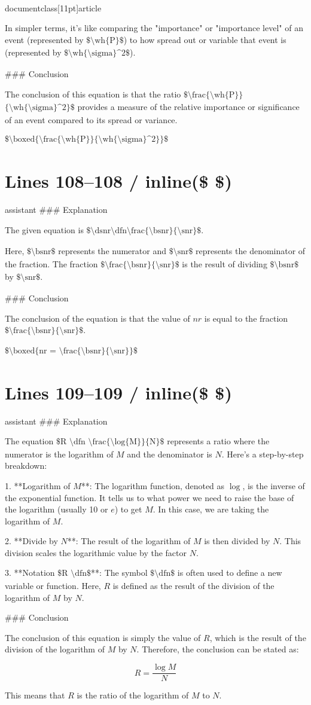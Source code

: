 \\documentclass[11pt]{article}
\begin{document}
In simpler terms, it's like comparing the "importance" or "importance level" of an event (represented by \(\wh{P}\)) to how spread out or variable that event is (represented by \(\wh{\sigma}^2\)).

### Conclusion

The conclusion of this equation is that the ratio \(\frac{\wh{P}}{\wh{\sigma}^2}\) provides a measure of the relative importance or significance of an event compared to its spread or variance.

\(\boxed{\frac{\wh{P}}{\wh{\sigma}^2}}\)


\section*{Lines 108–108 / inline(\$ \$) }
assistant
### Explanation

The given equation is \(\dsnr\dfn\frac{\bsnr}{\snr}\).

Here, \(\bsnr\) represents the numerator and \(\snr\) represents the denominator of the fraction. The fraction \(\frac{\bsnr}{\snr}\) is the result of dividing \(\bsnr\) by \(\snr\).

### Conclusion

The conclusion of the equation is that the value of \(nr\) is equal to the fraction \(\frac{\bsnr}{\snr}\).

\(\boxed{nr = \frac{\bsnr}{\snr}}\)


\section*{Lines 109–109 / inline(\$ \$) }
assistant
### Explanation

The equation \( R \dfn \frac{\log{M}}{N} \) represents a ratio where the numerator is the logarithm of \( M \) and the denominator is \( N \). Here's a step-by-step breakdown:

1. **Logarithm of \( M \)**: The logarithm function, denoted as \( \log \), is the inverse of the exponential function. It tells us to what power we need to raise the base of the logarithm (usually 10 or \( e \)) to get \( M \). In this case, we are taking the logarithm of \( M \).

2. **Divide by \( N \)**: The result of the logarithm of \( M \) is then divided by \( N \). This division scales the logarithmic value by the factor \( N \).

3. **Notation \( R \dfn \)**: The symbol \( \dfn \) is often used to define a new variable or function. Here, \( R \) is defined as the result of the division of the logarithm of \( M \) by \( N \).

### Conclusion

The conclusion of this equation is simply the value of \( R \), which is the result of the division of the logarithm of \( M \) by \( N \). Therefore, the conclusion can be stated as:

\[ R = \frac{\log{M}}{N} \]

This means that \( R \) is the ratio of the logarithm of \( M \) to \( N \).

\end{document}
